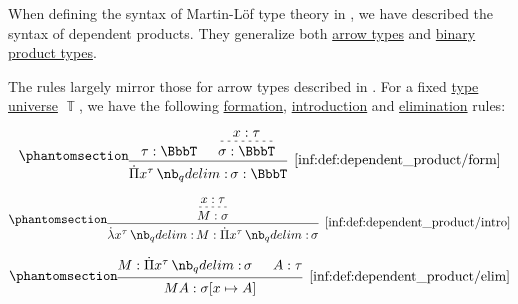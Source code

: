 \begin{definition}\label{def:dependent_product}
  When defining the syntax of Martin-L\"of type theory in , we have described the syntax of dependent products. They generalize both \hyperref[def:arrow_type]{arrow types} and \hyperref[def:simple_product_type]{binary product types}.

  The rules largely mirror those for arrow types described in . For a fixed \hyperref[con:type_universe]{type universe} \( \BbbT \), we have the following \hyperref[rem:type_theory_rule_classification/form]{formation}, \hyperref[rem:type_theory_rule_classification/intro]{introduction} and \hyperref[rem:type_theory_rule_classification/elim]{elimination} rules:
  \begin{paracol}{3}
    \begin{nthcolumn}{0}
      \ParacolAlignmentHack
      \begin{equation*}\taglabel[\ensuremath{ \Pi_{\logic{form}} }]{inf:def:dependent_product/form}
        \begin{prooftree}
          \hypo{ \tau: \BbbT }

          \hypo{ x: \tau }
          \infer[dashed]1{ \sigma: \BbbT }

          \infer2[\ref{inf:def:dependent_product/form}]{ \qprod {x^\tau} \sigma: \BbbT }
        \end{prooftree}
      \end{equation*}
    \end{nthcolumn}

    \begin{nthcolumn}{1}
      \ParacolAlignmentHack
      \begin{equation*}\taglabel[\ensuremath{ \Pi_+ }]{inf:def:dependent_product/intro}
        \begin{prooftree}
          \hypo{ x: \tau }
          \infer[dashed]1{ M: \sigma }
          \infer1[\ref{inf:def:dependent_product/intro}]{ \qabs {x^\tau} M: \qprod {x^\tau} \sigma }
        \end{prooftree}
      \end{equation*}
    \end{nthcolumn}

    \begin{nthcolumn}{2}
      \ParacolAlignmentHack
      \begin{equation*}\taglabel[\ensuremath{ \Pi_- }]{inf:def:dependent_product/elim}
        \begin{prooftree}
          \hypo{ M: \qprod {x^\tau} \sigma }
          \hypo{ A: \tau }
          \infer2[\ref{inf:def:dependent_product/elim}]{ M A: \sigma[x \mapsto A] }
        \end{prooftree}
      \end{equation*}
    \end{nthcolumn}
  \end{paracol}


\end{definition}

